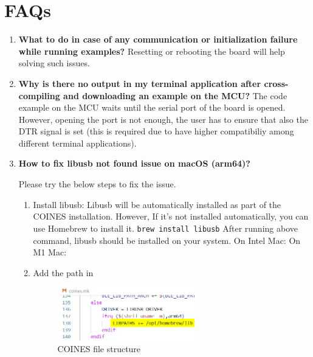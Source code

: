 
\section{FAQs}

\begin{enumerate}

\item \textbf{What to do in case of any communication or initialization failure while running examples?}
\newline Resetting or rebooting the board will help solving such issues.

\item \textbf{Why is there no output in my terminal application after cross-compiling and downloading an example on the MCU?}
\newline The code example on the MCU waits until the serial port of the board is opened. However, opening the port is not enough, the user has to ensure that also the DTR signal is set (this is required due to have higher compatibiliy among different terminal applications).


\item \textbf{How to fix libusb not found issue on macOS (arm64)?}

Please try the below steps to fix the issue.
\begin{enumerate}
    \item Install libusb:
    Libusb will be automatically installed as part of the COINES installation. However, If it’s not installed automatically, you can use Homebrew to install it. 
    \lstinline|brew install libusb|
    \newline After running above command, libusb should be installed on your system.
    \newline On Intel Mac: 
    \newline On M1 Mac: 
    \item Add the path in 
    \begin{figure}[H]
        \begin{center}
            \includegraphics[width=0.6\textwidth]{coinesAPI_images/Mac_libusb_include.png}
            \caption{COINES file structure}
        \end{center}
    \end{figure}
\end{enumerate}


\end{enumerate}
